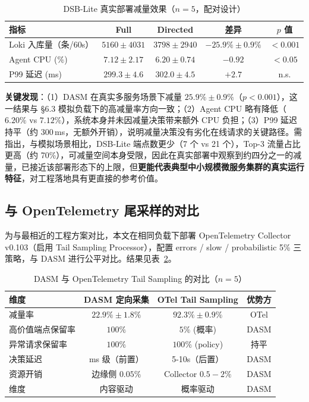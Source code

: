 \begin{table}[H]
  \centering\small
  \caption{DSB-Lite 真实部署减量效果（$n{=}5$，配对设计）}\label{tab:dsb-real}
  \begin{tabular}{lcccc}
    \toprule
    指标 & Full & Directed & 差异 & $p$ 值 \\
    \midrule
    Loki 入库量（条/60s） & $5160{\pm}4031$ & $3798{\pm}2940$
      & $-25.9\%{\pm}0.9\%$ & $<0.001$ \\
    Agent CPU (\%) & $7.12{\pm}2.17$ & $6.20{\pm}0.74$
      & $-0.92$ & $<0.05$ \\
    P99 延迟 (ms) & $299.3{\pm}4.6$ & $302.0{\pm}4.5$
      & $+2.7$ & n.s. \\
    \bottomrule
  \end{tabular}
\end{table}

\textbf{关键发现}：（1）DASM 在真实多服务场景下减量 $25.9\% \pm 0.9\%$（$p<0.001$），这一结果与 §6.3 模拟负载下的高减量率方向一致；（2）Agent CPU 略有降低（$6.20\%$ vs $7.12\%$），系统本身并未因减量决策带来额外 CPU 负担；（3）P99 延迟持平（约 300\,ms，无额外开销），说明减量决策没有劣化在线请求的关键路径。需指出，与模拟场景相比，DSB-Lite 端点数更少（7 个 vs 21 个），Top-3 流量占比更高（约 70\%），可减量空间本身受限，因此在真实部署中观察到约四分之一的减量，已接近该部署形态下的上限，但\textbf{更能代表典型中小规模微服务集群的真实运行特征}，对工程落地具有更直接的参考价值。

\subsection{与 OpenTelemetry 尾采样的对比}
\label{sec:otel-cmp}

为与最相近的工程方案对比，本文在相同负载下部署 OpenTelemetry Collector v0.103（启用 Tail Sampling Processor），配置 errors / slow / probabilistic 5\% 三策略，与 DASM 进行公平对比。结果见表~\ref{tab:otel-cmp}。

\begin{table}[H]
  \centering\small
  \caption{DASM 与 OpenTelemetry Tail Sampling 的对比（$n{=}5$）}
  \label{tab:otel-cmp}
  \begin{tabular}{lccc}
    \toprule
    维度 & DASM 定向采集 & OTel Tail Sampling & 优势方 \\
    \midrule
    减量率 & $22.9\%{\pm}1.8\%$ & $92.3\%{\pm}0.9\%$ & OTel \\
    高价值端点保留率 & $100\%$ & $5\%$ (概率) & DASM \\
    异常请求保留率 & $100\%$ & $100\%$ (policy) & 持平 \\
    决策延迟 & ms 级（前置） & 5-10s（后置） & DASM \\
    资源开销 & 边缘侧 $0.05\%$ & Collector $0.5{-}2\%$ & DASM \\
    维度 & 内容驱动 & 概率驱动 & DASM \\
    \bottomrule
  \end{tabular}
\end{table}

